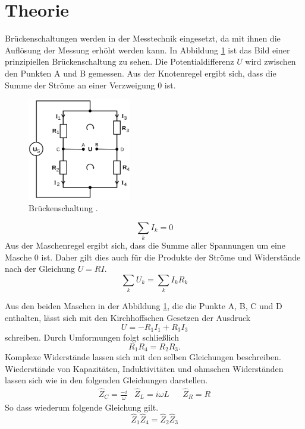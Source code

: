 \section{Theorie}
\label{sec:Theorie}
Brückenschaltungen werden in der Messtechnik eingesetzt, da mit ihnen die Auflösung
der Messung erhöht werden kann.
In Abbildung \ref{fig:Brueckenschaltung} ist das Bild einer prinzipiellen Brückenschaltung zu sehen.
Die Potentialdifferenz $U$ wird zwischen den Punkten A und B gemessen. Aus der
Knotenregel ergibt sich, dass die Summe der Ströme an einer Verzweigung $0$ ist.


\begin{figure}
  \centering
  \includegraphics[width=0.4\textwidth]{Bilder/Brueckenschaltung.png}
  \caption{Brückenschaltung \cite{sample}.}
  \label{fig:Brueckenschaltung}
\end{figure}
\begin{equation}
  \sum \limits_{k} I_k= 0
  \label{eq:knotenregel}
\end{equation}
Aus der Maschenregel ergibt sich, dass die Summe aller Spannungen um eine Masche
$0$ ist. Daher gilt dies auch für die Produkte der Ströme und Widerstände nach
der Gleichung $U=RI$.
\begin{equation}
  \sum \limits_{k} U_k=  \sum \limits_{k} I_k R_k
  \label{eq:Maschenregel}
\end{equation}

Aus den beiden Maschen in der Abbildung \ref{fig:Brueckenschaltung}, die die Punkte
A, B, C und D enthalten, lässt sich mit den Kirchhoffschen Gesetzen
der Ausdruck
\begin{equation}
  U=-R_1 I_1 + R_3 I_3
\end{equation}
schreiben. Durch Umformungen folgt schließlich
\begin{equation}
  R_1 R_4 =R_2 R_3   .
  \label{eq:Widerstand}
\end{equation}
Komplexe Widerstände lassen sich mit den selben Gleichungen beschreiben.
Wiederstände von Kapazitäten, Induktivitäten und ohmschen Widerständen lassen sich
wie in den folgenden Gleichungen darstellen.
\begin{align}
&\hat{Z}_C = \frac{-i}{\omega}  &  \hat{Z}_L=i\omega L & & \hat{Z}_R = R &
\end{align}
So dass wiederum folgende Gleichung gilt.
\begin{equation}
\hat{Z}_1\hat{Z}_4=\hat{Z}_2\hat{Z}_3
\end{equation}

